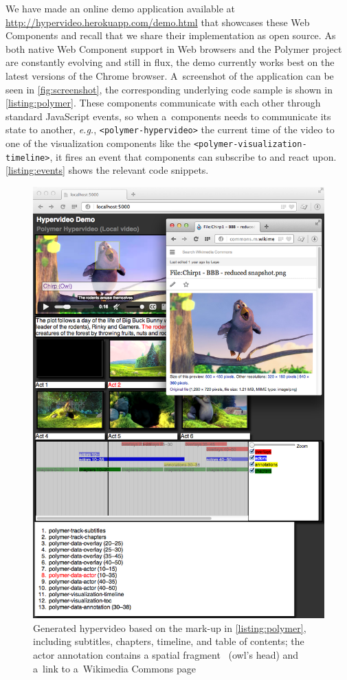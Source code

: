\documentclass[runningheads,a4paper]{llncs}
\begin{document}
\noindent We have made an online demo application available at
\url{http://hypervideo.herokuapp.com/demo.html} that showcases these Web Components
and recall that we share their implementation as open source.
As both native Web Component support in Web browsers and the Polymer project
are constantly evolving and still in flux, the demo currently works best on
the latest versions of the Chrome browser.
A~screenshot of the application can be seen in \autoref{fig:screenshot},
the corresponding underlying code sample is shown in \autoref{listing:polymer}.
These components communicate with each other through standard JavaScript events,
so when a~components needs to communicate its state to another, \emph{e.g.},
\texttt{<polymer-hypervideo>} the current time of the video to one of the
visualization components like the \texttt{<polymer-visualization-timeline>},
it fires an event that components can subscribe to and react upon.
\autoref{listing:events} shows the relevant code snippets.

\begin{figure}[p!]
  \centering
  \includegraphics[width=1\linewidth]{screenshot}
  \caption{Generated hypervideo based on the mark-up in \autoref{listing:polymer},
  including subtitles, chapters, timeline, and table of contents;
  the actor annotation contains a spatial fragment~\cite{troncy2012mediafragments}
  (owl's head) and a~link
  to a~Wikimedia Commons page}
  \label{fig:screenshot}
\end{figure}
\end{document}
